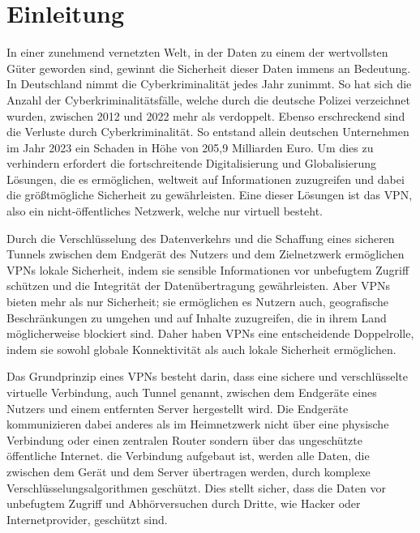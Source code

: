 \chapter{Einleitung} \label{introduction}
In einer zunehmend vernetzten Welt, in der Daten zu einem der wertvollsten Güter geworden sind, gewinnt die Sicherheit dieser Daten immens an Bedeutung. In Deutschland nimmt die Cyberkriminalität jedes Jahr zunimmt. So hat sich die Anzahl der Cyberkriminalitätsfälle, welche durch die deutsche Polizei verzeichnet wurden, zwischen 2012 und 2022 mehr als verdoppelt. \cite{Filed_cybercrime_cases_Germany_2022} Ebenso erschreckend sind die Verluste durch Cyberkriminalität. So entstand allein deutschen Unternehmen im Jahr 2023 ein Schaden in Höhe von 205,9 Milliarden Euro. \cite{Cybercrime_financial_loss_in_Germany_2023} Um dies zu verhindern erfordert die fortschreitende Digitalisierung und Globalisierung Lösungen, die es ermöglichen, weltweit auf Informationen zuzugreifen und dabei die größtmögliche Sicherheit zu gewährleisten. Eine dieser Lösungen ist das \gls{VPN}, also ein nicht-öffentliches Netzwerk, welche nur virtuell besteht. 

Durch die Verschlüsselung des Datenverkehrs und die Schaffung eines sicheren Tunnels zwischen dem Endgerät des Nutzers und dem Zielnetzwerk ermöglichen \gls{VPN}s lokale Sicherheit, indem sie sensible Informationen vor unbefugtem Zugriff schützen und die Integrität der Datenübertragung gewährleisten. Aber \gls{VPN}s bieten mehr als nur Sicherheit; sie ermöglichen es Nutzern auch, geografische Beschränkungen zu umgehen und auf Inhalte zuzugreifen, die in ihrem Land möglicherweise blockiert sind. Daher haben \gls{VPN}s eine entscheidende Doppelrolle, indem sie sowohl globale Konnektivität als auch lokale Sicherheit ermöglichen. \cite{Vergleich_der_besten_VPN-Protokolle_Nord_VPN}

Das Grundprinzip eines \gls{VPN}s besteht darin, dass eine sichere und verschlüsselte virtuelle Verbindung, auch Tunnel genannt, zwischen dem Endgeräte eines Nutzers und einem entfernten Server hergestellt wird. Die Endgeräte kommunizieren dabei anderes als im Heimnetzwerk nicht über eine physische Verbindung oder einen zentralen Router sondern über das ungeschützte öffentliche Internet. die Verbindung aufgebaut ist, werden alle Daten, die zwischen dem Gerät und dem Server übertragen werden, durch komplexe Verschlüsselungsalgorithmen geschützt. Dies stellt sicher, dass die Daten vor unbefugtem Zugriff und Abhörversuchen durch Dritte, wie Hacker oder Internetprovider, geschützt sind. \cite{Vergleich_der_besten_VPN-Protokolle_Nord_VPN}\cite{Wie_funktioniert_ein_Virtual_Private_Network_VPN}

